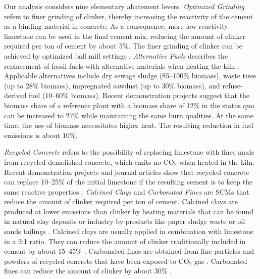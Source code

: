 \documentclass[12pt, a4paper]{article} %
\begin{document}
Our analysis considers nine elementary abatement levers. \emph{Optimized Grinding} refers to finer grinding of clinker, thereby increasing the reactivity of the cement as a binding material in concrete. As a consequence, more low-reactivity limestone can be used in the final cement mix, reducing the amount of clinker required per ton of cement by about 5\%. The finer grinding of clinker can be achieved by optimized ball mill settings \citep{ghalandari2020energy,bohm2015energy}. \emph{Alternative Fuels} describes the replacement of fossil fuels with alternative materials when heating the kiln \citep{uson2013uses,rahman2015recent}. Applicable alternatives include dry sewage sludge (85--100\% biomass), waste tires (up to 28\% biomass), impregnated sawdust (up to 30\% biomass), and refuse-derived fuel (10--60\% biomass). Recent demonstration projects suggest that the biomass share of a reference plant with a biomass share of 12\% in the status quo can be increased to 27\% while maintaining the same burn qualities. At the same time, the use of biomass necessitates higher heat. The resulting reduction in fuel emissions is about 10\%.

\emph{Recycled Concrete} refers to the possibility of replacing limestone with fines made from recycled demolished concrete, which emits no CO$_2$ when heated in the kiln. Recent demonstration projects and journal articles show that recycled concrete can replace 10--25\% of the initial limestone if the resulting cement is to keep the same reactive properties \citep{cantero2020mechanical,cantero2021water}. \emph{Calcined Clays} and \emph{Carbonated Fines} are SCMs that reduce the amount of clinker required per ton of cement. Calcined clays are produced at lower emissions than clinker by heating materials that can be found in natural clay deposits or industry by-products like paper sludge waste or oil sands tailings \citep{gcca2022calcined}. Calcined clays are usually applied in combination with limestone in a 2:1 ratio. They can reduce the amount of clinker traditionally included in cement by about 15--45\% \citep{scrivener2018calcined,sharma2021limestone,hanein2022clay}. Carbonated fines are obtained from fine particles and powders of recycled concrete that have been exposed to CO$_2$ gas \citep{ouyang2020surface}. Carbonated fines can reduce the amount of clinker by about 30\% \citep{zajac2020effect}.
\end{document}

